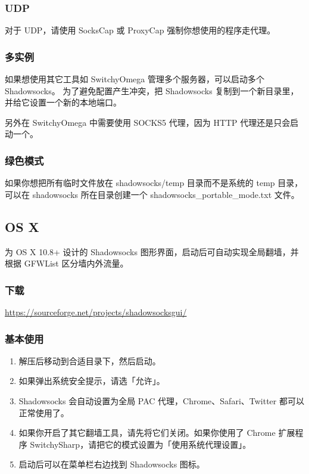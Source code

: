 \documentclass[11pt,a4paper]{sphinxmanual}
\begin{document}
\subsubsection{UDP}
\label{sec-2-3-1-6}
对于 UDP，请使用 SocksCap 或 ProxyCap 强制你想使用的程序走代理。

\subsubsection{多实例}
\label{sec-2-3-1-7}
如果想使用其它工具如 SwitchyOmega 管理多个服务器，可以启动多个 Shadowsocks。 为了避免配置产生冲突，把 Shadowsocks 复制到一个新目录里，并给它设置一个新的本地端口。

另外在 SwitchyOmega 中需要使用 SOCKS5 代理，因为 HTTP 代理还是只会启动一个。

\subsubsection{绿色模式}
\label{sec-2-3-1-8}
如果你想把所有临时文件放在 shadowsocks/temp 目录而不是系统的 temp 目录， 可以在 shadowsocks 所在目录创建一个 shadowsocks\_portable\_mode.txt 文件。



\subsection{OS X}
\label{sec-2-3-2}
为 OS X 10.8+ 设计的 Shadowsocks 图形界面，启动后可自动实现全局翻墙，并根据 GFWList 区分墙内外流量。

\subsubsection{下载}
\label{sec-2-3-2-1}
\href{https://sourceforge.net/projects/shadowsocksgui/}{\url{https://sourceforge.net/projects/shadowsocksgui/}}

\subsubsection{基本使用}
\label{sec-2-3-2-2}
\begin{enumerate}
\item 解压后移动到合适目录下，然后启动。
\item 如果弹出系统安全提示，请选「允许」。
\item Shadowsocks 会自动设置为全局 PAC 代理，Chrome、Safari、Twitter 都可以正常使用了。
\item 如果你开启了其它翻墙工具，请先将它们关闭。如果你使用了 Chrome 扩展程序 SwitchySharp，请把它的模式设置为「使用系统代理设置」。
\item 启动后可以在菜单栏右边找到 Shadowsocks 图标。
\end{enumerate}
\end{document}
